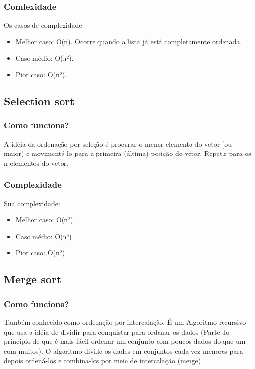 \documentclass{report}
\begin{document}
	\subsubsection{Comlexidade}
	Os casos de complexidade
	
	\begin{itemize}
		\item Melhor caso: O(n). Ocorre quando a lista já está completamente ordenada.
		\item Caso médio: O(n²).
		\item Pior caso: O(n²).
	\end{itemize}
	\subsection{Selection sort}
	\subsubsection{Como funciona?}
	A idéia da ordenação por seleção é
	procurar o menor elemento do
	vetor (ou maior) e movimentá-lo
	para a primeira (última) posição do
	vetor. Repetir para os n elementos do
	vetor.
	\subsubsection{Complexidade}
	Sua complexidade:
	
	\begin{itemize}
		\item Melhor caso: O(n²)
		\item Caso médio: O(n²)
		\item Pior caso: O(n²)
	\end{itemize}
	
	\subsection{Merge sort}
	\subsubsection{Como funciona?}
	
	Também conhecido como ordenação por intercalação. É um Algoritmo recursivo que usa a idéia de dividir para conquistar para
	ordenar os dados (Parte do princípio de que é mais fácil ordenar um conjunto com poucos dados do que um com muitos). O algoritmo divide os dados em conjuntos cada vez menores para depois ordená-los e combina-los por meio de intercalação (merge)
	
\end{document}

